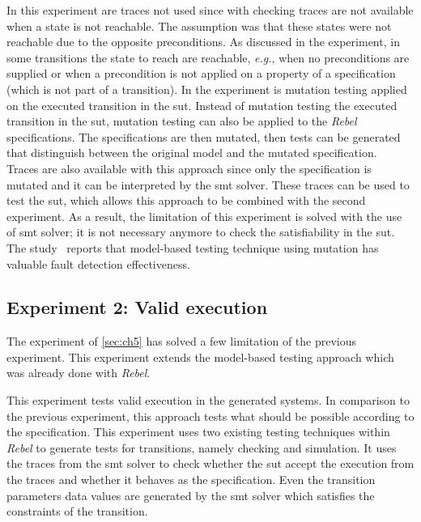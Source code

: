 In this experiment are traces not used since with checking traces are not
available when a state is not reachable. The assumption was that these states
were not reachable due to the opposite preconditions. As discussed in the
experiment, in some transitions the state to reach are reachable, \textit{e.g.},
when no preconditions are supplied or when a precondition is not applied on a
property of a specification (which is not part of a transition). In the
experiment is mutation testing applied on the executed transition in the
\gls{sut}. Instead of mutation testing the executed transition in the
\gls{sut}, mutation testing can also be applied to the \textit{Rebel}
specifications.
The specifications are then mutated, then tests can be generated that
distinguish between the original model and the mutated
specification.~\cite[p.~8]{utting2012taxonomy}
Traces are also available with this approach since only the specification is
mutated and it can be interpreted by the \gls{smt} solver. These traces can be
used to test the \gls{sut}, which allows this approach to be combined with the
second experiment. As a result, the limitation of this experiment is solved
with the use of \gls{smt} solver; it is not necessary anymore to check the
satisfiability in the \gls{sut}. The study~\cite{paradkar2005case} reports that
model-based testing technique using mutation has valuable fault detection
effectiveness.


\subsection{Experiment 2: Valid execution}
The experiment of \autoref{sec:ch5} has solved a few limitation of the previous
experiment. This experiment extends the model-based testing approach which was
already done with \textit{Rebel}.

This experiment tests valid execution in the generated systems. In comparison to
the previous experiment, this approach tests what should be possible according
to the specification. This experiment uses two existing testing techniques
within \textit{Rebel} to generate tests for transitions, namely checking and
simulation. It uses the traces from the \gls{smt} solver to check whether the
\gls{sut} accept the execution from the traces and whether it behaves as the
specification. Even the transition parameters data values are generated by the
\gls{smt} solver which satisfies the constraints of the transition.

